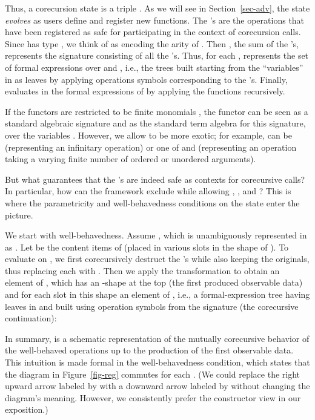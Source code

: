 \documentclass[preprint,draft]
{sigplanconf}
\newcommand{\<}{\langle}
\renewcommand{\>}{\rangle}
\def\S{Section~}
\begin{document}
Thus, a corecursion state is a triple .
As we will see in \S\ref{sec-adv}, the state {\em evolves} as users
define and register new functions.
The 's are the operations that have been registered as
safe for participating in the context of corecursion calls.
Since  has type , we think of  as encoding the arity of .
Then , the sum of the 's, represents the signature consisting of all the 's.
Thus, for each ,
 represents the set of formal expressions over  and , i.e., the trees built
starting from the ``variables'' in  as leaves by
applying operations symbols corresponding to the 's.
Finally,  evaluates in  the formal expressions of  by applying
the functions  recursively.

If the functors  are restricted to be finite monomials , the functor
 can be seen as a standard algebraic signature
and  as the standard term algebra for this signature, over the variables .
However, we allow  to be more exotic; for example, 
can be  (representing an infinitary operation) or one of  and 
(representing an operation taking a varying finite number of ordered or unordered arguments).

But what guarantees that the 's are indeed safe as contexts for corecursive
calls? In particular, how can the framework
exclude  while allowing , , and
? This is where the parametricity and well-behavedness conditions on
the state enter the picture.

We start with well-behavedness.
Assume , which is unambiguously represented in  as .
Let  be the content items of  (placed in various slots
in the shape of ). To evaluate  on ,
we first corecursively destruct the 's while also keeping the originals, thus replacing each  with
.
Then we apply the transformation  to obtain an element of , which has an -shape at the top
(the first produced observable data) and for each slot in this shape an element of ,
i.e., a formal-expression tree having leaves in  and built using operation symbols from the signature
(the corecursive continuation):

In summary,  is a schematic representation of the mutually corecursive behavior of the well-behaved operations
up to the production of the first observable data.
This intuition is made formal in the well-behavedness condition, which states that the diagram in Figure~\ref{fig-reg} commutes for each . (We could replace the right upward arrow labeled by  with a downward arrow labeled by  without changing the diagram's meaning.
However, we consistently prefer the constructor view in our exposition.)
\end{document}
